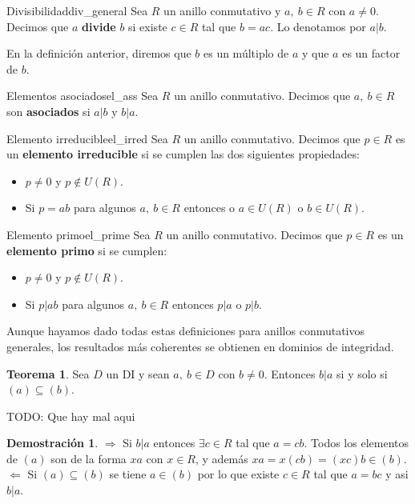 \documentclass[a4paper]{book}
\theoremstyle{definition}
\newtheorem{theorem}{Teorema}[section]
\theoremstyle{ejemplo}
\theoremstyle{demostracion}
\newtheorem{dem}{Demostración}
\begin{document}
\begin{define}{Divisibilidad}{div_general}
	Sea $R$ un anillo conmutativo y $a,\ b \in R$ con $a \neq 0$. Decimos que $a$ \textbf{divide} $b$ si existe $c \in R$ tal que $b = ac$. Lo denotamos por $a|b$.
\end{define}
En la definición anterior, diremos que $b$ es un múltiplo de $a$ y que $a$ es un factor de $b$.
\begin{define}{Elementos asociados}{el_ass}
	Sea $R$ un anillo conmutativo. Decimos que $a,\ b \in R$ son \textbf{asociados} si $a|b$ y $b|a$.
\end{define}
\begin{define}{Elemento irreducible}{el_irred}
	Sea $R$ un anillo conmutativo. Decimos que $p \in R$ es un \textbf{elemento irreducible} si se cumplen las dos siguientes propiedades:
	\begin{itemize}
		\item
		$p \neq 0$ y $p \not \in U(R)$.
		\item
		Si $p = ab$ para algunos $a,\ b \in R$ entonces o $a \in U(R)$ o $b \in U(R)$.
	\end{itemize}
\end{define}
\begin{define}{Elemento primo}{el_prime}
	Sea $R$ un anillo conmutativo. Decimos que $p \in R$ es un \textbf{elemento primo} si se cumplen:
	\begin{itemize}
		\item
		$p \neq 0$ y $p \not \in U(R)$.
		\item
		Si $p|ab$ para algunos $a,\ b \in R$ entonces $p|a$ o $p|b$.
	\end{itemize}
\end{define}
Aunque hayamos dado todas estas definiciones para anillos conmutativos generales, los resultados más coherentes se obtienen en dominios de integridad.
\begin{theorem}
	Sea $D$ un DI y sean $a,\ b \in D$ con $b \neq 0$. Entonces $b|a$ si y solo si $(a) \subseteq (b)$.
\end{theorem}
TODO: Que hay mal aqui
\begin{dem}
	$\Rightarrow$ Si $b|a$ entonces $\exists c \in R$ tal que $a = cb$. Todos los elementos de $(a)$ son de la forma $xa$ con $x \in R$, y además $xa = x(cb) = (xc)b \in (b)$.\\ 
	$\Leftarrow$ Si $(a) \subseteq (b)$ se tiene $a \in (b)$ por lo que existe $c \in R$ tal que $a = bc$ y asi $b|a$.
\end{dem}
\end{document}
